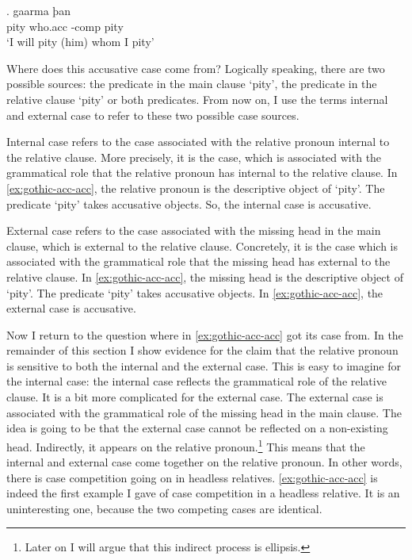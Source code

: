 \exg. gaarma þan  \\
 pity\scsub{[acc]} who.\ac{acc} -\ac{comp} pity\scsub{[acc]}\\
 `I will pity (him) whom I pity' \label{ex:gothic-acc-acc}

Where does this accusative case come from? Logically speaking, there are two possible sources: the predicate in the main clause  `pity', the predicate in the relative clause  `pity' or both predicates. From now on, I use the terms internal and external case to refer to these two possible case sources.

Internal case refers to the case associated with the relative pronoun internal to the relative clause. More precisely, it is the case, which is associated with the grammatical role that the relative pronoun has internal to the relative clause. In \ref{ex:gothic-acc-acc}, the relative pronoun is the descriptive object of  `pity'. The predicate  `pity' takes accusative objects. So, the internal case is accusative.

External case refers to the case associated with the missing head in the main clause, which is external to the relative clause. Concretely, it is the case which is associated with the grammatical role that the missing head has external to the relative clause. In \ref{ex:gothic-acc-acc}, the missing head is the descriptive object of  `pity'. The predicate  `pity' takes accusative objects. In \ref{ex:gothic-acc-acc}, the external case is accusative.

Now I return to the question where  in \ref{ex:gothic-acc-acc} got its case from. In the remainder of this section I show evidence for the claim that the relative pronoun is sensitive to both the internal and the external case.
This is easy to imagine for the internal case: the internal case reflects the grammatical role of the relative clause. It is a bit more complicated for the external case. The external case is associated with the grammatical role of the missing head in the main clause. The idea is going to be that the external case cannot be reflected on a non-existing head. Indirectly, it appears on the relative pronoun.\footnote{
Later on I will argue that this indirect process is ellipsis.
}
This means that the internal and external case come together on the relative pronoun. In other words, there is case competition going on in headless relatives. \ref{ex:gothic-acc-acc} is indeed the first example I gave of case competition in a headless relative. It is an uninteresting one, because the two competing cases are identical.

